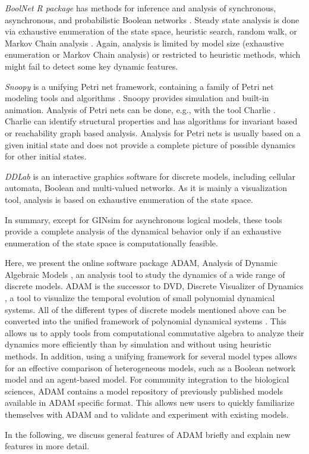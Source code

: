 \documentclass[11pt]{amsart}
\begin{document}
{\it BoolNet R package} has methods for inference and analysis of synchronous, asynchronous, and probabilistic Boolean networks \cite{boolnet}. Steady state analysis is done via exhaustive enumeration of the state space, heuristic search, random walk, or Markov Chain analysis \cite{shmulevich}. Again, analysis is limited by model size (exhaustive enumeration or Markov Chain analysis) or restricted to heuristic methods, which might fail to detect some key dynamic features.


{\it Snoopy} is a unifying Petri net framework, containing a family of Petri net modeling tools and algorithms \cite{Snoopy}. Snoopy provides simulation and built-in animation. Analysis of Petri nets can be done, e.g., with the tool Charlie \cite{Charlie}. Charlie can identify structural properties and has algorithms for invariant based or reachability graph based analysis. Analysis for Petri nets is usually based on a given initial state and does not provide a complete picture of possible dynamics for other initial states.

{\it DDLab} is an interactive graphics software for discrete models, including cellular automata, Boolean and multi-valued networks. As it is mainly a visualization tool, analysis is based on exhaustive enumeration of the state space.



In summary, except for GINsim for asynchronous logical models, these tools provide a complete analysis of the dynamical behavior only if an exhaustive enumeration of the state space is computationally feasible. 




Here, we present the online software package ADAM, Analysis of Dynamic Algebraic Models \cite{ADAM}, an analysis tool to study the dynamics of a wide range of discrete models. ADAM is the successor to DVD, Discrete Visualizer of Dynamics \cite{DVD}, a tool to visualize the temporal evolution of small polynomial dynamical systems. All of the different types of discrete models mentioned above can be
converted into the unified framework of polynomial dynamical systems
\cite{Alan:Bioinf2010, Hinkelmann:2010}. This allows us to apply tools from
computational commutative algebra to analyze their dynamics more efficiently than by simulation and without using heuristic methods. In addition, using a unifying framework for several model types
allows for an effective comparison of heterogeneous models, such as a Boolean network model and an agent-based model.
For community integration to the biological sciences, ADAM contains a model repository of  previously published models available in ADAM specific format. This allows new users to quickly familiarize themselves with ADAM and to validate and experiment with existing models.

In the following, we discuss general features of ADAM briefly and explain new features in more detail.
\end{document}
